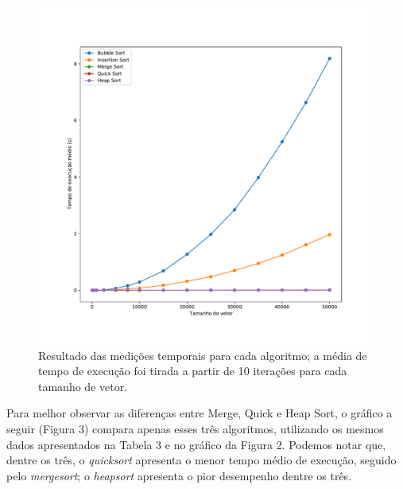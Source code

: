 \documentclass[fontsize=10pt]{article}
\begin{document}
\begin{figure}[H]
\begin{center}
    \includegraphics[scale=0.5]{comparacao_2.pdf}
    \caption{Resultado das medições temporais para cada algoritmo; a média de tempo de execução foi tirada a partir de 10 iterações para cada tamanho de vetor.}
    \label{Figura 2}
\end{center}
\end{figure}

\quad Para melhor observar as diferenças entre Merge, Quick e Heap Sort, o gráfico a seguir (Figura 3) compara apenas esses três algoritmos, utilizando os mesmos dados apresentados na Tabela 3 e no gráfico da Figura 2. Podemos notar que, dentre os três, o \textit{quicksort} apresenta o menor tempo médio de execução, seguido pelo \textit{mergesort}; o \textit{heapsort} apresenta o pior desempenho dentre os três.
\end{document}
